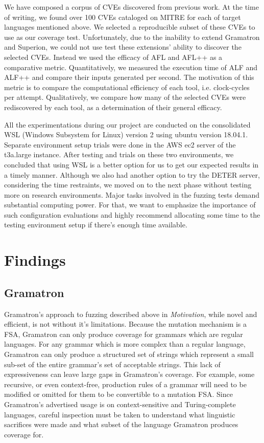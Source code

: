 \documentclass[12pt]{diazessay}
\begin{document}
We have composed a corpus of CVEs discovered from previous work.
At the time of writing, we found over 100 CVEs cataloged on MITRE\cite{MITRE} for each of target languages mentioned above.
We selected a reproducible subset of these CVEs to use as our coverage test.
Unfortunately, due to the inability to extend Gramatron and Superion, we could not use test these extensions' ability to discover the selected CVEs.
Instead we used the efficacy of AFL and AFL++ as a comparative metric.
Quantitatively, we measured the execution time of ALF and ALF++ and compare their inputs generated per second.
The motivation of this metric is to compare the computational efficiency of each tool, i.e. clock-cycles per attempt.
Qualitatively, we compare how many of the selected CVEs were rediscovered by each tool, as a determination of their general efficacy.

All the experimentations during our project are conducted on the consolidated WSL (Windows Subsystem for Linux) version 2 using ubuntu version 18.04.1.
Separate environment setup trials were done in the AWS ec2 server of the t3a.large instance.
After testing and trials on these two environments, we concluded that using WSL is a better option for us to get our expected results in a timely manner.
Although we also had another option to try the DETER server, considering the time restraints, we moved on to the next phase without testing more on research environments.
Major tasks involved in the fuzzing tests demand substantial computing power.
For that, we want to emphasize the importance of such configuration evaluations and highly recommend allocating some time to the testing environment setup if there's enough time available.

\section*{Findings}
\label{results}

\subsection*{Gramatron}

Gramatron's approach to fuzzing described above in \emph{Motivation}, while novel and efficient, is not without it's limitations.
Because the mutation mechanism is a FSA, Gramatron can only produce coverage for grammars which are regular languages.
For any grammar which is more complex than a regular language, Gramatron can only produce a structured set of strings which represent a small sub-set of the entire grammar's set of acceptable strings.
This lack of expressiveness can leave large gaps in Gramatron's coverage.
For example, some recursive, or even context-free, production rules of a grammar will need to be modified or omitted for them to be convertible to a mutation FSA.
Since Gramatron's advertised usage is on context-sensitive and Turing-complete languages, careful inspection must be taken to understand what linguistic sacrifices were made and what subset of the language Gramatron produces coverage for.
\end{document}
